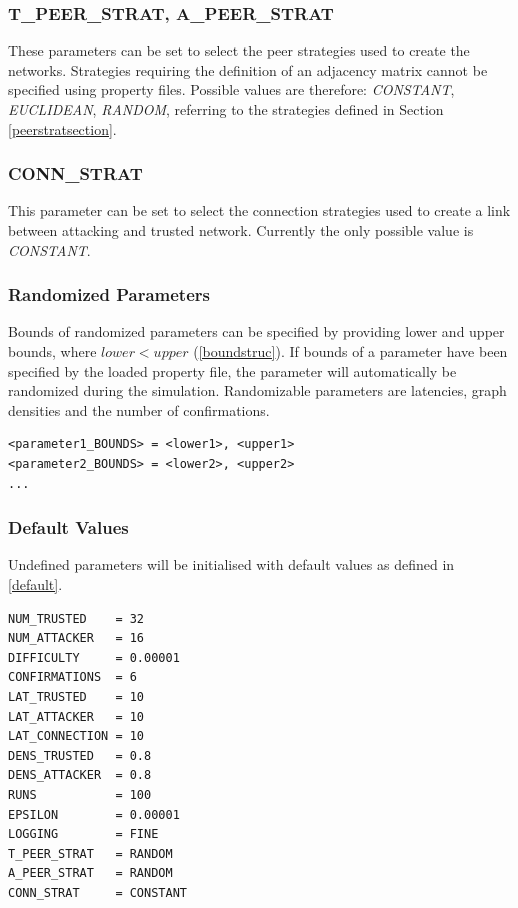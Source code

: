 \documentclass[a4paper,12pt,twoside]{report}
\begin{document}
\subsubsection{T\_PEER\_STRAT, A\_PEER\_STRAT}
These parameters can be set to select the peer strategies used to create the networks. Strategies requiring the definition of an adjacency matrix cannot be specified using property files. Possible values are therefore: \textit{CONSTANT}, \textit{EUCLIDEAN}, \textit{RANDOM}, referring to the strategies defined in Section \ref{peerstratsection}.
\subsubsection{CONN\_STRAT}
This parameter can be set to select the connection strategies used to create a link between attacking and trusted network. Currently the only possible value is \textit{CONSTANT}.
\subsubsection{Randomized Parameters}
Bounds of randomized parameters can be specified by providing lower and upper bounds, where $lower < upper$ (\autoref{boundstruc}). If bounds of a parameter have been specified by the loaded property file, the parameter will automatically be randomized during the simulation. Randomizable parameters are latencies, graph densities and the number of confirmations.
\begin{lstlisting}[caption=Defining bounds of randomized parameters,label=boundstruc]
<parameter1_BOUNDS> = <lower1>, <upper1>
<parameter2_BOUNDS> = <lower2>, <upper2>
...
\end{lstlisting}
\subsubsection{Default Values}\label{defaultval}
Undefined parameters will be initialised with default values as defined in \autoref{default}. 
\begin{lstlisting}[caption=Default parameter values,label=default]
NUM_TRUSTED    = 32
NUM_ATTACKER   = 16
DIFFICULTY     = 0.00001
CONFIRMATIONS  = 6
LAT_TRUSTED    = 10
LAT_ATTACKER   = 10
LAT_CONNECTION = 10
DENS_TRUSTED   = 0.8
DENS_ATTACKER  = 0.8
RUNS           = 100
EPSILON        = 0.00001
LOGGING        = FINE
T_PEER_STRAT   = RANDOM
A_PEER_STRAT   = RANDOM
CONN_STRAT     = CONSTANT
\end{lstlisting}
\clearpage

\listoffigures
\clearpage

\listoftables
\clearpage



\end{document}
